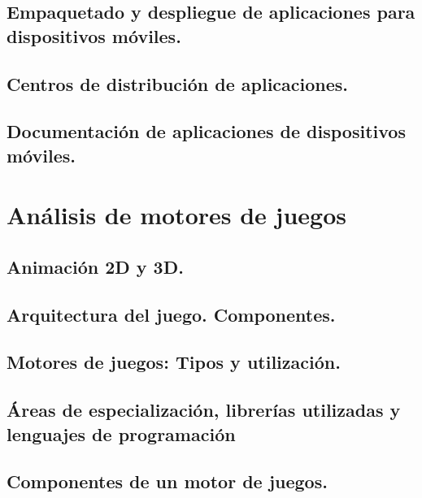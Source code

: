 \documentclass[a4paper,12pt,spanish]{sphinxmanual}
\begin{document}
\section{Empaquetado y despliegue de aplicaciones para dispositivos móviles.}
\label{tema2:empaquetado-y-despliegue-de-aplicaciones-para-dispositivos-moviles}

\section{Centros de distribución de aplicaciones.}
\label{tema2:centros-de-distribucion-de-aplicaciones}

\section{Documentación de aplicaciones de dispositivos móviles.}
\label{tema2:documentacion-de-aplicaciones-de-dispositivos-moviles}

\chapter{Análisis de motores de juegos}
\label{index:analisis-de-motores-de-juegos}

\section{Animación 2D y 3D.}
\label{index:animacion-2d-y-3d}

\section{Arquitectura del juego. Componentes.}
\label{index:arquitectura-del-juego-componentes}

\section{Motores de juegos: Tipos y utilización.}
\label{index:motores-de-juegos-tipos-y-utilizacion}

\section{Áreas de especialización, librerías utilizadas y lenguajes de programación}
\label{index:areas-de-especializacion-librerias-utilizadas-y-lenguajes-de-programacion}

\section{Componentes de un motor de juegos.}
\label{index:componentes-de-un-motor-de-juegos}
\end{document}
